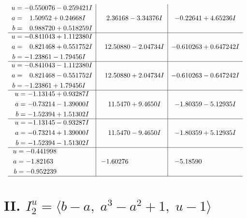 \documentclass[1p]{elsarticle_modified}
\theoremstyle{definition}
\begin{document}
$$\begin{array}{c|c|c}
\begin{aligned}
u &= -0.550076 - 0.259421 I \\
a &= \phantom{-}1.50952 + 0.24668 I \\
b &= \phantom{-}0.988720 + 0.518259 I\end{aligned}
 & \phantom{-}2.36168 - 3.34376 I & -0.22641 + 4.65236 I \\ \hline\begin{aligned}
u &= -0.841043 + 1.112380 I \\
a &= \phantom{-}0.821468 + 0.551752 I \\
b &= -1.23861 - 1.79456 I\end{aligned}
 & \phantom{-}12.50880 - 2.04734 I & -0.610263 + 0.647242 I \\ \hline\begin{aligned}
u &= -0.841043 - 1.112380 I \\
a &= \phantom{-}0.821468 - 0.551752 I \\
b &= -1.23861 + 1.79456 I\end{aligned}
 & \phantom{-}12.50880 + 2.04734 I & -0.610263 - 0.647242 I \\ \hline\begin{aligned}
u &= -1.13145 + 0.93287 I \\
a &= -0.73214 - 1.39000 I \\
b &= -1.52394 + 1.51302 I\end{aligned}
 & \phantom{-}11.5470 + 9.4650 I & -1.80359 - 5.12935 I \\ \hline\begin{aligned}
u &= -1.13145 - 0.93287 I \\
a &= -0.73214 + 1.39000 I \\
b &= -1.52394 - 1.51302 I\end{aligned}
 & \phantom{-}11.5470 - 9.4650 I & -1.80359 + 5.12935 I \\ \hline\begin{aligned}
u &= -0.441998\phantom{ +0.000000I} \\
a &= -1.82163\phantom{ +0.000000I} \\
b &= -0.952239\phantom{ +0.000000I}\end{aligned}
 & -1.60276\phantom{ +0.000000I} & -5.18590\phantom{ +0.000000I}\\
 \hline 
 \end{array}$$\newpage\newpage\renewcommand{\arraystretch}{1}
\centering \section*{II. $I^u_{2}= \langle b- a,\;a^3- a^2+1,\;u-1 \rangle$}
\end{document}
